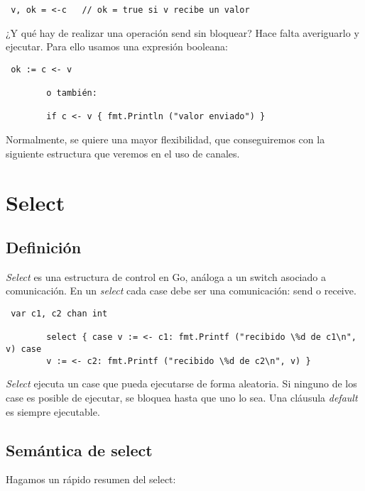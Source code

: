 	\begin{verbatim} v, ok = <-c   // ok = true si v recibe un valor
	\end{verbatim}
	
	¿Y qué hay de realizar una operación send sin bloquear? Hace falta
	averiguarlo y ejecutar. Para ello usamos una expresión booleana:
	
	\begin{verbatim} ok := c <- v
	   
		o también:
	   
		if c <- v { fmt.Println ("valor enviado") } \end{verbatim}
	
	Normalmente, se quiere una mayor flexibilidad, que conseguiremos con la
	siguiente estructura que veremos en el uso de canales.

\section{Select}

	\subsection{Definición}
	
	\textit{Select} es una estructura de control en Go, análoga a un switch
	asociado a comunicación. En un \textit{select} cada case debe ser una
	comunicación: send o receive.
	
	\begin{verbatim} var c1, c2 chan int
	   
		select { case v := <- c1: fmt.Printf ("recibido \%d de c1\n", v) case
		v := <- c2: fmt.Printf ("recibido \%d de c2\n", v) } \end{verbatim}
	
	\textit{Select} ejecuta un case que pueda ejecutarse de forma aleatoria. Si
	ninguno de los case es posible de ejecutar, se bloquea hasta que uno lo sea.
	Una cláusula \textit{default} es siempre ejecutable.
	
	\subsection{Semántica de select}
	
	Hagamos un rápido resumen del select:
	
